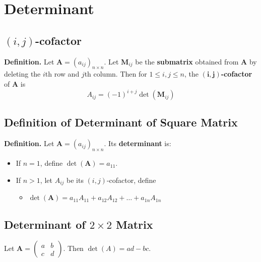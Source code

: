 \documentclass[../ma2001_notes.tex]{subfiles}
\begin{document}
\section{Determinant}
\subsection{$(i,j)$-cofactor}
\textbf{Definition.} Let \(\bm{A}=(a_{ij})_{n\times n}\). Let \(\bm{M}_{ij}\) be the \textbf{submatrix} obtained from \(\bm{A}\) by deleting the \(i\)th row and \(j\)th column. Then for \(1\leq i,j\leq n\), the \(\bm{(i,j)}\)\textbf{-cofactor} of \(\bm{A}\) is
\[A_{ij}=(-1)^{i+j}\det(\bm{M}_{ij})\]

\subsection{Definition of Determinant of Square Matrix}
\textbf{Definition.} Let \(\bm{A}=(a_{ij})_{n\times n}\). Its \textbf{determinant} is:
\begin{itemize}
	\item If \(n=1\), define \(\det(\bm{A})=a_{11}\).
	\item If \(n>1\), let \(A_{ij}\) be its \((i,j)\)-cofactor, define
	\begin{itemize}
		\item\(\det(\bm{A})=a_{11}A_{11}+a_{12}A_{12}+\ldots+a_{1n}A_{1n}\)
	\end{itemize}
\end{itemize}

\subsection{Determinant of $2\times 2$ Matrix}
Let \(\bm{A}=\begin{pmatrix}
	a & b \\ c & d
\end{pmatrix}\). Then \(\det(A)=ad-bc\).
\end{document}
